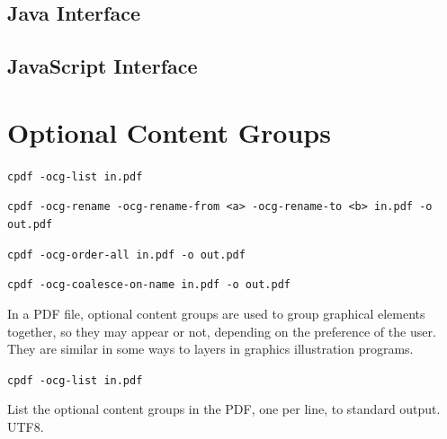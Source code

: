 \documentclass{book}
\begin{document}
\begin{jcpdflib}
\clearpage
\section*{Java Interface}
\begin{small}\tt

\end{small}
\end{jcpdflib}

\begin{jscpdflib}
\clearpage
\section*{JavaScript Interface}
\begin{small}\tt

\end{small}
\end{jscpdflib}

\clearpage\pagestyle{empty}
\chapter{Optional Content Groups}\label{chap:16}\pagestyle{fancy}

  {\small\begin{framed}
  \noindent\verb!cpdf -ocg-list in.pdf!

  \vspace{1.5mm}
  \noindent\verb!cpdf -ocg-rename -ocg-rename-from <a> -ocg-rename-to <b> in.pdf -o out.pdf!

  \vspace{1.5mm}
  \noindent\verb!cpdf -ocg-order-all in.pdf -o out.pdf!

  \vspace{1.5mm}
  \noindent\verb!cpdf -ocg-coalesce-on-name in.pdf -o out.pdf!

  \end{framed}}


In a PDF file, optional content groups are used to group graphical elements together, so they may appear or not, depending on the preference of the user. They are similar in some ways to layers in graphics illustration programs.

  {\small\begin{framed}
  \noindent\verb!cpdf -ocg-list in.pdf!
  \end{framed}}

\noindent List the optional content groups in the PDF, one per line, to standard output. UTF8.
  
\end{document}
